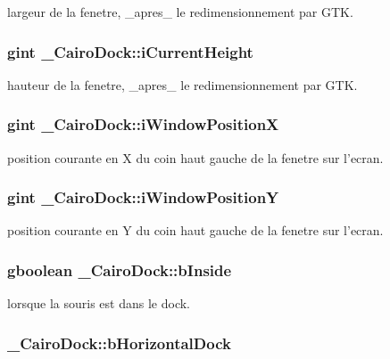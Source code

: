 largeur de la fenetre, \_\-apres\_\- le redimensionnement par GTK. 

\subsubsection{\setlength{\rightskip}{0pt plus 5cm}gint {\bf \_\-CairoDock::iCurrentHeight}}\label{struct__CairoDock_768cd3d7e7d3755257b3c8f728436aae}


hauteur de la fenetre, \_\-apres\_\- le redimensionnement par GTK. 

\subsubsection{\setlength{\rightskip}{0pt plus 5cm}gint {\bf \_\-CairoDock::iWindowPositionX}}\label{struct__CairoDock_350e80cc165ca7f9fbb38aad56f715eb}


position courante en X du coin haut gauche de la fenetre sur l'ecran. 

\subsubsection{\setlength{\rightskip}{0pt plus 5cm}gint {\bf \_\-CairoDock::iWindowPositionY}}\label{struct__CairoDock_183e9c6c7ac97503b4b31a020e807d1d}


position courante en Y du coin haut gauche de la fenetre sur l'ecran. 

\subsubsection{\setlength{\rightskip}{0pt plus 5cm}gboolean {\bf \_\-CairoDock::bInside}}\label{struct__CairoDock_e177aed10f2cd552c075f39865961fd3}


lorsque la souris est dans le dock. 

\subsubsection{ {\bf \_\-CairoDock::bHorizontalDock}}\label{struct__CairoDock_290f1d413855290cad575617e02a57bb}


